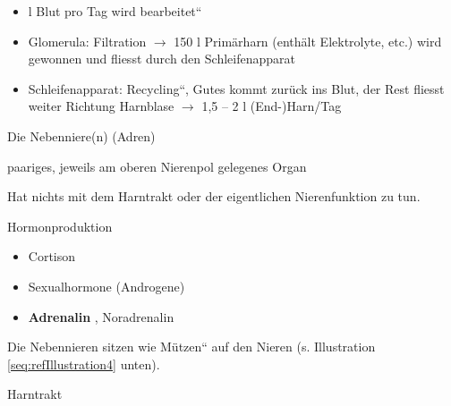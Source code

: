 \documentclass{article}
\newcommand\gEs[1]{\textbf{\textcolor[rgb]{0.0,0.0,0.5019608}{#1}}}
\newcommand\gEs[1]{\textbf{\textcolor[rgb]{0.0,0.0,0.5019608}{#1}}}
\begin{document}
\begin{itemize}
\item { l Blut pro Tag wird {\quotedblbase}bearbeitet{\textquotedblleft}}

\item {\mdseries
Glomerula: Filtration ${\rightarrow}$ 150  l
Prim\"arharn (enth\"alt Elektrolyte, etc.) wird
gewonnen und fliesst durch den Schleifenapparat}

\item {\mdseries
Schleifenapparat: {\quotedblbase}Recycling{\textquotedblleft}, Gutes
kommt zur\"uck ins Blut, der Rest fliesst weiter Richtung Harnblase
${\rightarrow}$ 1,5 -- 2  l (End-)Harn/Tag }

\end{itemize}
{\mdseries\color[rgb]{0.0,0.0,0.5019608}
Die Nebenniere(n) (Adren)}

{\mdseries
paariges, jeweils am oberen Nierenpol gelegenes Organ}

{\mdseries
Hat nichts  mit dem Harntrakt oder der eigentlichen Nierenfunktion zu
tun.}

{\mdseries
Hormonproduktion}

\begin{itemize}
\item {\mdseries
Cortison}

\item {\mdseries
Sexualhormone (Androgene)}

\item {\mdseries
\gEs{Adrenalin} , Noradrenalin}

\end{itemize}
{\mdseries
Die Nebennieren sitzen wie {\quotedblbase}M\"utzen{\textquotedblleft}
auf den Nieren (s. Illustration \ref{seq:refIllustration4} unten). }

{\mdseries\color[rgb]{0.0,0.0,0.5019608}
Harntrakt}
\end{document}
